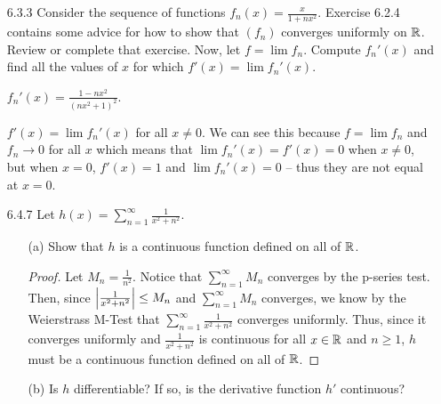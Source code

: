 \documentclass[12pt,letterpaper]{article}
\begin{document}
\begin{itemize}[leftmargin=!,labelindent=5pt]
\begin{itemize}
\begin{proof}
                        Since $\abs{f_n}\leq M$ and $\abs{g_n} \leq M$ for all $n \in \bbN$, this simplifies to $M\frac{\epsilon}{2M} + M\frac{\epsilon}{2M} = \epsilon$.
                        So, $\abs{f_n(x)g_n(x) - f_m(x)g_m(x)} < \epsilon$ for all $m,n \geq N$ and $x\in A$.
                        Thus, $(f_n g_n)$ converges uniformly.
                    \end{proof}
            \end{itemize}
        \item [6.3.3] Consider the sequence of functions $f_n(x) = \frac{x}{1+nx^2}$. Exercise 6.2.4 contains some advice for how to show that $(f_n)$ converges uniformly on $\mathbb{R}$. Review or complete that exercise. Now, let $f = \lim f_n$. Compute $f_n'(x)$ and find all the values of $x$ for which $f'(x) = \lim f_n'(x)$.
            
            $f_n'(x) = \frac{1-nx^2}{(nx^2 + 1)^2}$.

            $f'(x) = \lim f_n'(x)$ for all $x \neq 0$.
            We can see this because $f = \lim f_n$ and $f_n \to 0$ for all $x$ which means that $\lim f_n'(x) = f'(x) = 0$ when $x \neq 0$, but when $x = 0$, $f'(x) = 1$ and $\lim f_n'(x) = 0$ -- thus they are not equal at $x=0$.
        \item [6.4.7] Let $h(x) = \sum_{n=1}^\infty \frac{1}{x^2 + n^2}$.
            \begin{itemize}
                \item [(a)] Show that $h$ is a continuous function defined on all of $\mathbb{R}$.
                    \begin{proof}
                        Let $M_n = \frac{1}{n^2}$.
                        Notice that $\sum_{n=1}^\infty M_n$ converges by the p-series test.
                        Then, since $\abs{\frac{1}{x^2 + n^2}} \leq M_n$ and $\sum_{n=1}^\infty M_n$ converges, we know by the Weierstrass M-Test that $\sum_{n=1}^\infty \frac{1}{x^2 + n^2}$ converges uniformly.
                        Thus, since it converges uniformly and $\frac{1}{x^2 + n^2}$ is continuous for all $x \in \mathbb{R}$ and $n \geq 1$, $h$ must be a continuous function defined on all of $\mathbb{R}$.
                    \end{proof}
                \item [(b)] Is $h$ differentiable? If so, is the derivative function $h'$ continuous?
                

\end{itemize}
\end{itemize}
\end{document}
